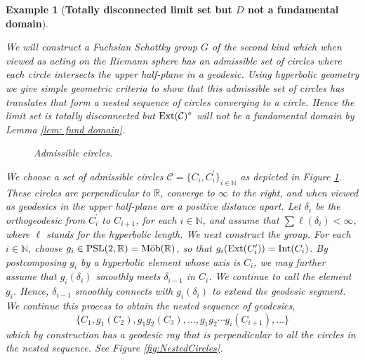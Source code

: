 \documentclass[12pt]{amsart}
\theoremstyle{plain}
\newtheorem{exam}[thm]{Example}
\DeclareMathOperator{\Mob}{\mbox{\rm{M\"ob}}}
\DeclareMathOperator{\Int}{\rm Int}
\DeclareMathOperator{\Ext}{\rm Ext}
\begin{document}
\begin{exam}[{\bf Totally disconnected limit set but $D$ not a fundamental domain}] 
\label{incomplete}

{\rm We will construct  a Fuchsian Schottky group $G$  of the second kind which when viewed as acting on the Riemann sphere has an admissible set of circles where each circle  intersects the upper half-plane in a geodesic. Using hyperbolic geometry we give simple geometric criteria to show that this admissible set of circles has translates that form a nested sequence of circles  converging to a circle. Hence the limit set is totally disconnected but $\Ext (\mathcal{C})^{\circ}$ will not be a fundamental domain by Lemma  \ref{lem: fund domain}. 

\begin{figure}[t]
\begin{center}
\vspace{-0.5cm}
\end{center}
\caption{Admissible circles.} \label{fig: FIGCircles}
\end{figure}

We choose a set of admissible circles 
$\mathcal{C}=\{C_i ,C_i ^{\prime}\}_{i \in \mathbb N}$ as 
depicted in Figure \ref{fig: FIGCircles}. These circles are perpendicular to 
$\mathbb{R}$, converge to $\infty$ to the right, and when viewed as geodesics in the upper half-plane are a positive distance apart. Let $\delta_{i}$ be the orthogeodesic 
from 
$C_{i} ^{\prime}$ to  $C_{i+1}$,
for each 
$i \in \mathbb N$, and assume that 
$\sum \ell(\delta_{i}) < \infty$, where $\ell$ stands for the hyperbolic length. We next construct the group. 
For each $i\in \mathbb{N}$, choose $g_{i} \in \text{PSL}(2, \mathbb{R})= \Mob(\mathbb R)$, so that
$g_i(\Ext(C_i^{\prime}))=\Int( C_i)$.  By postcomposing $g_{i}$ 
by a hyperbolic element whose axis is $C_i$, we may 
further assume that 
$g_{i}(\delta_{i})$ smoothly meets   
$\delta_{i-1}$ in $C_i$.
We continue to call the element 
$g_i$. Hence, 
$\delta_{i-1}$ smoothly connects with $g_{i}(\delta_{i})$
to extend the geodesic segment.
We continue this process to  obtain the nested  sequence of 
geodesics, 
$$
\{C_{1}, g_{1}(C_{2}), 
g_{1}g_{2}(C_{3}),\ldots, 
g_{1}g_{2}\cdots g_{i}(C_{i+1}),\ldots\}
$$
which by construction has a geodesic ray that is perpendicular to all the circles in the nested sequence. See Figure \ref{fig:NestedCircles}. 

}
\end{exam}
\end{document}

